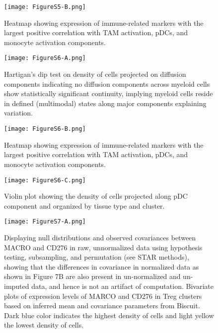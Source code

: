 \begin{figure}
\centering
\texttt{[image: FigureS5-B.png]}
\caption{Heatmap showing expression of immune-related markers with the largest positive correlation with TAM activation, pDCs, and monocyte activation components.
}
\label{fig:s5b}
\end{figure}

\begin{figure}
\centering
\texttt{[image: FigureS6-A.png]}
\caption{Hartigan’s dip test on density of cells projected on diffusion components indicating no diffusion components across myeloid cells show statistically significant continuity, implying myeloid cells reside in defined (multimodal) states along major components explaining variation.}
\label{fig:s6a}
\end{figure}

\begin{figure}
\centering
\texttt{[image: FigureS6-B.png]}
\caption{Heatmap showing expression of immune-related markers with the largest positive correlation with TAM activation, pDCs, and monocyte activation components.
}
\label{fig:s6b}
\end{figure}


\begin{figure}
\centering
\texttt{[image: FigureS6-C.png]}
\caption{Violin plot showing the density of cells projected along pDC component and organized by tissue type and cluster.
}
\label{fig:s6c}
\end{figure}


\begin{figure}
\centering
\texttt{[image: FigureS7-A.png]}
\caption{Displaying null distributions and observed covariances between MACRO and CD276 in raw, unnormalized data using hypothesis testing, subsampling, and permutation (see STAR methods), showing that the differences in covariance in normalized data as shown in  Figure 7B are also present in un-normalized and un-imputed data, and hence is not an artifact of computation.
Bivariate plots of expression levels of MARCO and CD276 in Treg clusters based on inferred mean and covariance parameters from Biscuit. Dark blue color indicates the highest density of cells and light yellow the lowest density of cells.
}
\label{fig:s7a}
\end{figure}

